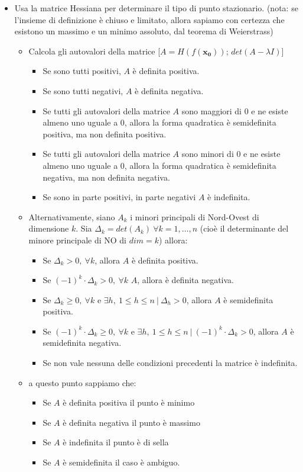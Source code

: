 \documentclass[a4paper,12pt]{article}
\begin{document}
\begin{itemize}
\item Usa la matrice Hessiana per determinare il tipo di punto stazionario. (nota: se l'insieme di definizione è chiuso e limitato, allora sapiamo con certezza che esistono un massimo e un minimo assoluto, dal teorema di Weierstrass)
\begin{itemize}
 \item Calcola gli autovalori della matrice [$A = H(f(\boldsymbol{x_0}))$; $det(A-\lambda I)$]
 \begin{itemize}
  \item Se sono tutti positivi, $A$ è definita positiva.
  \item Se sono tutti negativi, $A$ è definita negativa.
  \item Se tutti gli autovalori della matrice $A$ sono maggiori di $0$ e ne esiste almeno uno uguale a $0$, allora la forma quadratica è semidefinita positiva, ma non definita positiva.
  \item Se tutti gli autovalori della matrice $A$ sono minori di $0$ e ne esiste almeno uno uguale a $0$, allora la forma quadratica è semidefinita negativa, ma non definita negativa.
  \item Se sono in parte positivi, in parte negativi $A$ è indefinita.
 \end{itemize}
 \item Alternativamente, siano $A_k$ i minori principali di Nord-Ovest di dimensione $k$.
Sia $\Delta_k=det(A_k)\ \forall k=1,\dots,n$ (cioè il determinante del minore principale di NO di $dim=k$) allora:
 \begin{itemize}
  \item Se $\Delta_k > 0,\ \forall k$, allora $A$ è definita positiva.
  \item Se $(-1)^k\cdot\Delta_k > 0, \ \forall k$ $A$, allora  è definita negativa.
  \item Se $\Delta_k \geq 0, \ \forall k$ e $\exists h, \ 1\le h \le n \ | \ \Delta_h> 0$, allora $A$ è semidefinita positiva. 
  \item Se $(-1)^k\cdot\Delta_k \geq 0, \ \forall k$ e $\exists h, \ 1\le h \le n \ |\ (-1)^k\cdot\Delta_k > 0 $, allora $A$   è semidefinita negativa. 
  \item Se non vale nessuna delle condizioni precedenti la matrice è indefinita.  
 \end{itemize}
 \item a questo punto sappiamo che:
 \begin{itemize}

 \item Se $A$ è definita positiva il punto è minimo
 \item Se $A$ è definita negativa il punto è massimo
 \item Se $A$ è indefinita il punto è di sella
 \item Se $A$ è semidefinita il caso è ambiguo.
 \end{itemize}
 

\end{itemize}
\end{itemize}
\end{document}
